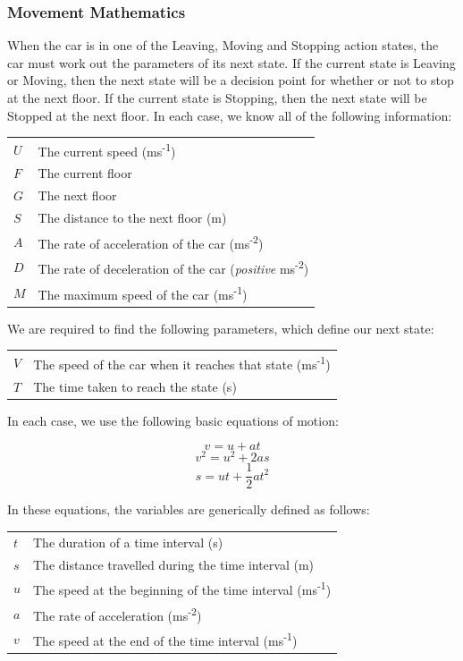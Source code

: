 \documentclass{UoYCSproject}
\begin{document}
\subsubsection{Movement Mathematics}

When the car is in one of the Leaving, Moving and Stopping action states, the car must work out the parameters of its next state.  If the current state is Leaving or Moving, then the next state will be a decision point for whether or not to stop at the next floor.  If the current state is Stopping, then the next state will be Stopped at the next floor.  In each case, we know all of the following information:

\begin{tabular}{l l}
	$U$ & The current speed (ms\textsuperscript{-1}) \\
	$F$ & The current floor \\
	$G$ & The next floor \\
	$S$ & The distance to the next floor (m) \\
	$A$ & The rate of acceleration of the car (ms\textsuperscript{-2}) \\
	$D$ & The rate of deceleration of the car (\textit{positive} ms\textsuperscript{-2}) \\
	$M$ & The maximum speed of the car (ms\textsuperscript{-1})
\end{tabular}

We are required to find the following parameters, which define our next state:

\begin{tabular}{l l}
	$V$ & The speed of the car when it reaches that state (ms\textsuperscript{-1}) \\
	$T$ & The time taken to reach the state (s)
\end{tabular}

In each case, we use the following basic equations of motion:

\begin{equation} \label{motioneq1} v=u+at\end{equation}
\begin{equation} \label{motioneq2} v^2=u^2+2as\end{equation}
\begin{equation} \label{motioneq3} s=ut+\frac{1}{2}at^2\end{equation}

In these equations, the variables are generically defined as follows:

\begin{tabular}{l l}
	$t$ & The duration of a time interval (s) \\
	$s$ & The distance travelled during the time interval (m) \\
	$u$ & The speed at the beginning of the time interval (ms\textsuperscript{-1}) \\
	$a$ & The rate of acceleration (ms\textsuperscript{-2}) \\
	$v$ & The speed at the end of the time interval (ms\textsuperscript{-1})
\end{tabular}
\end{document}
